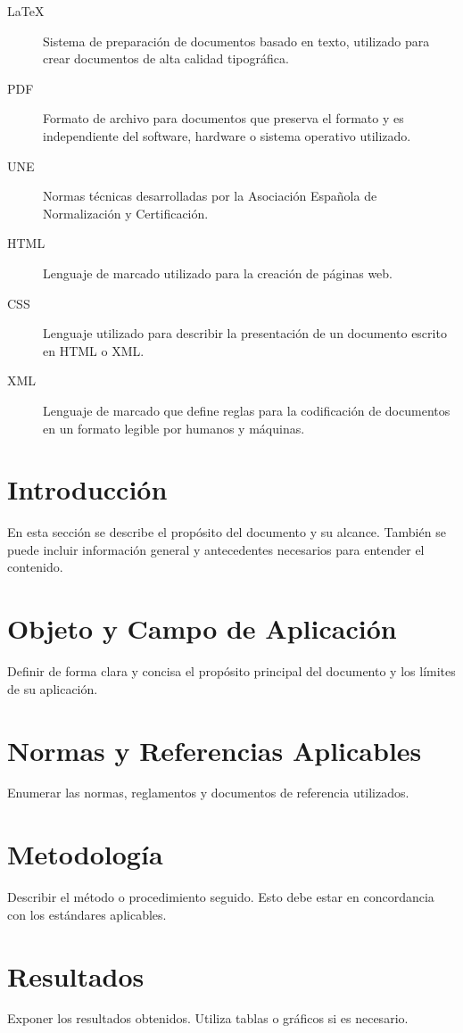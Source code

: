 \documentclass[a4paper,12pt]{article}
\begin{document}
\begin{Form}
\begin{description}
  \item[LaTeX] Sistema de preparación de documentos basado en texto, utilizado para crear documentos de alta calidad tipográfica.
  \item[PDF] Formato de archivo para documentos que preserva el formato y es independiente del software, hardware o sistema operativo utilizado.
  \item[UNE] Normas técnicas desarrolladas por la Asociación Española de Normalización y Certificación.
  \item[HTML] Lenguaje de marcado utilizado para la creación de páginas web.
  \item[CSS] Lenguaje utilizado para describir la presentación de un documento escrito en HTML o XML.
  \item[XML] Lenguaje de marcado que define reglas para la codificación de documentos en un formato legible por humanos y máquinas.
\end{description}


\newpage

\section{Introducción}
En esta sección se describe el propósito del documento y su alcance. También se puede incluir información general y antecedentes necesarios para entender el contenido.

\section{Objeto y Campo de Aplicación}
Definir de forma clara y concisa el propósito principal del documento y los límites de su aplicación.

\section{Normas y Referencias Aplicables}
Enumerar las normas, reglamentos y documentos de referencia utilizados.


\section{Metodología}
Describir el método o procedimiento seguido. Esto debe estar en concordancia con los estándares aplicables.

\section{Resultados}
Exponer los resultados obtenidos. Utiliza tablas o gráficos si es necesario.


\end{Form}
\end{document}

